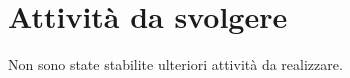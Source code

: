 \documentclass[8pt]{article}
\newcommand{\signatureline}[1]{%
	 \par\vspace{0.5cm}
	\noindent\makebox[\linewidth][r]{\rule{0.2\textwidth}{0.5pt}\hspace{3cm}\makebox[0pt][r]{\vspace{3pt}\footnotesize #1}}%
}
\begin{document}
\section{Attività da svolgere}
Non sono state stabilite ulteriori attività da realizzare.

\end{document}
